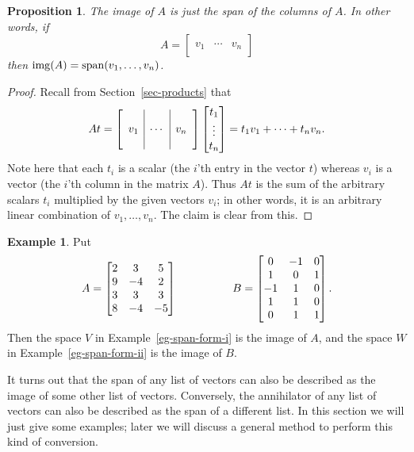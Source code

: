 \documentclass[reqno]{amsart}
\newtheorem{proposition}[theorem]{Proposition}
\theoremstyle{definition}
\newtheorem{example}[theorem]{Example}
\begin{document}
\begin{proposition}\label{prop-img-span}
 The image of $A$ is just the span of the columns of $A$.  In other
 words, if 
 \[ A = \left[\begin{array}{c|c|c}
        && \\ v_1 & \dotsb & v_n \\ &&
       \end{array}\right]
 \]
 then $\operatorname{img}(A)=\operatorname{span}(v_1,\dotsc,v_n)$.
\end{proposition}
\begin{proof}
 Recall from Section~\ref{sec-products} that 
 \[ At = 
       \left[\begin{array}{c|c|c}
        && \\ v_1 & \dotsb & v_n \\ &&
       \end{array}\right] 
       \left[\begin{matrix} t_1 \\ \vdots \\ t_n \end{matrix}\right]
       = 
       t_1v_1 + \dotsb + t_nv_n.
 \]
 Note here that each $t_i$ is a scalar (the $i$'th entry in the vector
 $t$) whereas $v_i$ is a vector (the $i$'th column in the matrix
 $A$).  Thus $At$ is the sum of the arbitrary scalars $t_i$ multiplied
 by the given vectors $v_i$; in other words, it is an arbitrary linear
 combination of $v_1,\dotsc,v_n$.  The claim is clear from this.
\end{proof}

\begin{example}\label{eg-img-span}
 Put
 \[ A =
    \left[\begin{matrix}
      2 &  3 &  5 \\
      9 & -4 &  2 \\
      3 &  3 &  3 \\
      8 & -4 & -5
    \end{matrix}\right]
    \hspace{5em}
    B = 
    \left[\begin{matrix}
      0 & -1 &  0 \\
      1 &  0 &  1 \\
     -1 &  1 &  0 \\
      1 &  1 &  0 \\
      0 &  1 &  1
    \end{matrix}\right]. 
 \]
 Then the space $V$ in Example~\ref{eg-span-form-i} is the image of
 $A$, and the space $W$ in Example~\ref{eg-span-form-ii} is the image
 of $B$.
\end{example}

It turns out that the span of any list of vectors can also be
described as the image of some other list of vectors.  Conversely, the
annihilator of any list of vectors can also be described as the span
of a different list.  In this section we will just give some examples;
later we will discuss a general method to perform this kind of
conversion.
\end{document}
